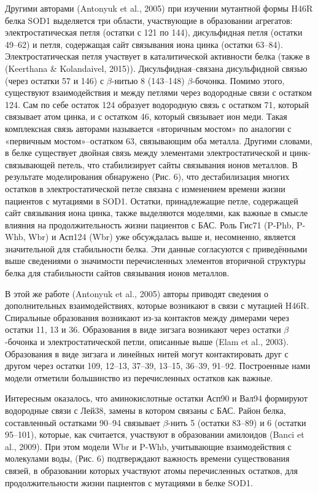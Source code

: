 Другими авторами (Antonyuk et al., 2005) при изучении мутантной формы H46R белка SOD1 выделяется три области, участвующие в образовании агрегатов: электростатическая петля (остатки с 121 по 144), дисульфидная петля (остатки  49–62) и петля, содержащая сайт связывания иона цинка (остатки  63–84).  Электростатическая петля участвует в каталитической активности белка (также в (Keerthana \& Kolandaivel, 2015)). Дисульфидная--связана дисульфидной связью (через остатки 57 и 146) с $\beta$-нитью 8 (143–148) $\beta$-бочонка. Помимо этого, существуют взаимодействия и между петлями через водородные связи с остатком 124. Сам по себе остаток 124 образует водородную связь с остатком 71, который связывает атом цинка, и с остатком 46, который связывает ион меди. Такая комплексная связь авторами называется «вторичным мостом» по аналогии с «первичным мостом»--остатком 63, связывающим оба металла. Другими словами, в белке существует двойная связь между элементами электростатической и цинк-связывающей петель, что стабилизирует сайты связывания ионов металлов. В результате моделирования обнаружено (Рис. 6), что дестабилизация многих остатков в электростатической петле связана с изменением времени жизни пациентов с мутациями в SOD1. Остатки, принадлежащие петле, содержащей сайт связывания иона цинка, также выделяются моделями, как важные в смысле влияния на продолжительность жизни пациентов с БАС. Роль Гис71 (P-Phb, P-Whb, Wbr) и Асп124 (Wbr) уже обсуждалась выше и, несомненно, является значительной для стабильности белка. Эти данные согласуются с приведёнными выше сведениями о значимости перечисленных элементов вторичной структуры белка для стабильности сайтов связывания ионов металлов. 

В этой же работе (Antonyuk et al., 2005) авторы приводят сведения о дополнительных взаимодействиях, которые возникают в связи с мутацией H46R. Спиральные образования возникают из-за контактов между димерами через остатки 11, 13 и 36. Образования в виде зигзага возникают через остатки $\beta$-бочонка и электростатической петли, описанные выше (Elam et al., 2003). Образования в виде зигзага и линейных нитей могут контактировать друг с другом через остатки 109, 12–13, 37–39, 13–15, 36–39, 91–92. Построенные нами модели отметили большинство из перечисленных остатков как важные.

Интересным оказалось, что  аминокислотные остатки Асп90 и Вал94 формируют водородные связи с Лей38, замены в котором связаны с БАС. Район белка, составленный остатками 90–94 связывает  $\beta$-нить 5 (остатки 83–89) и 6 (остатки 95–101), которые, как считается, участвуют в образовании амилоидов (Banci et al., 2009). При этом модели Wbr и P-Whb, учитывающие взаимодействия с молекулами воды, (Рис. 6) подтверждают важность времени существования связей, в образовании которых участвуют атомы перечисленных остатков, для продолжительности жизни пациентов с мутациями в белке SOD1.

